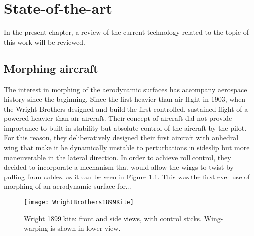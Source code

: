 \chapter{State-of-the-art} \label{chap:State_of_the_art}

In the present chapter, a review of the current technology related to the topic of this work will be reviewed.

\section{Morphing aircraft} \label{sec:Morphing_state}

The interest in morphing of the aerodynamic surfaces has accompany aerospace history since the beginning. Since the first heavier-than-air flight in 1903, when the Wright Brothers designed and build the first controlled, sustained flight of a powered heavier-than-air aircraft. Their concept of aircraft did not provide importance to built-in stability but absolute control of the aircraft by the pilot. For this reason, they deliberatively designed their first aircraft with anhedral wing that make it be dynamically unstable to perturbations in sideslip but more maneuverable in the lateral direction. In order to achieve roll control, they decided to incorporate a mechanism that would allow the wings to twist by pulling from cables, as it can be seen in Figure \ref{fig:Wright}. This was the first ever use of morphing of an aerodynamic surface for...

\begin{figure}[!htpb]
  \centering
  \texttt{[image: WrightBrothers1899Kite]}
  \caption[Schematic view of the beam closed section]{Wright 1899 kite: front and side views, with control sticks. Wing-warping is shown in lower view. \cite{Wright}}\label{fig:Wright}
\end{figure}

